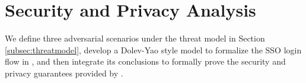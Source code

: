 \section{Security and Privacy Analysis}
\label{sec:analysis}
We define three adversarial scenarios under the threat model in Section \ref{subsec:threatmodel}, develop a Dolev-Yao style model \cite{BrowserID} to formalize the SSO login flow in \usso,
 and then integrate its conclusions to formally prove the security and privacy guarantees provided by \usso.










